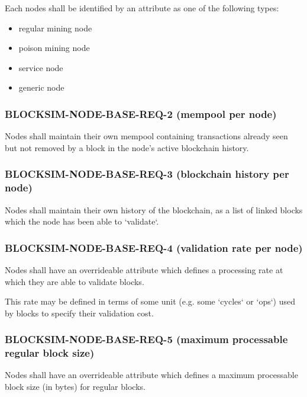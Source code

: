 \documentclass{scrreprt}
\begin{document}
        Each nodes shall be identified by an attribute as one of the following
        types:

        \begin{itemize}
          \item regular mining node
          \item poison mining node
          \item service node
          \item generic node
        \end{itemize}

      \subsubsection{BLOCKSIM-NODE-BASE-REQ-2 (mempool per node)}

        Nodes shall maintain their own mempool containing transactions already
        seen but not removed by a block in the node's active blockchain history.

      \subsubsection{BLOCKSIM-NODE-BASE-REQ-3 (blockchain history per node)}

        Nodes shall maintain their own history of the blockchain, as a list of
        linked blocks which the node has been able to `validate`.

      \subsubsection{BLOCKSIM-NODE-BASE-REQ-4 (validation rate per node)}

        Nodes shall have an overrideable attribute which defines a processing
        rate at which they are able to validate blocks.

        This rate may be defined in terms of some unit (e.g. some `cycles` or
        `ops`) used by blocks to specify their validation cost.

      \subsubsection{BLOCKSIM-NODE-BASE-REQ-5 (maximum processable regular block size)}

        Nodes shall have an overrideable attribute which defines a maximum
        processable block size (in bytes) for regular blocks.
\end{document}

